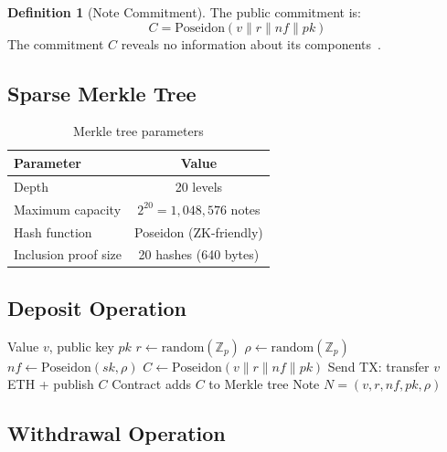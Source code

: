 \documentclass[11pt]{article}
\theoremstyle{definition}
\newtheorem{definition}{Definition}[section]
\theoremstyle{plain}
\theoremstyle{remark}
\begin{document}
\begin{definition}[Note Commitment]
The public commitment is:
\begin{equation}
C = \text{Poseidon}(v \| r \| nf \| pk)
\end{equation}
The commitment $C$ reveals no information about its components~\cite{grassi2021poseidon}.
\end{definition}

\subsection{Sparse Merkle Tree}

\begin{table}[H]
\centering
\caption{Merkle tree parameters}
\label{tab:merkle}
\begin{tabular}{lc}
\toprule
\textbf{Parameter} & \textbf{Value} \\
\midrule
Depth & 20 levels \\
Maximum capacity & $2^{20} = 1,048,576$ notes \\
Hash function & Poseidon (ZK-friendly) \\
Inclusion proof size & 20 hashes (640 bytes) \\
\bottomrule
\end{tabular}
\end{table}

\subsection{Deposit Operation}

\begin{algorithm}[H]
\caption{ZK Bank Deposit}
\label{alg:deposit}
\begin{algorithmic}[1]
\Require Value $v$, public key $pk$
\State $r \gets \text{random}(\mathbb{Z}_p)$ 
\State $\rho \gets \text{random}(\mathbb{Z}_p)$ 
\State $nf \gets \text{Poseidon}(sk, \rho)$ 
\State $C \gets \text{Poseidon}(v \| r \| nf \| pk)$ 
\State Send TX: transfer $v$ ETH + publish $C$
\State Contract adds $C$ to Merkle tree
\State \Return Note $N = (v, r, nf, pk, \rho)$ 
\end{algorithmic}
\end{algorithm}

\subsection{Withdrawal Operation}
\end{document}

